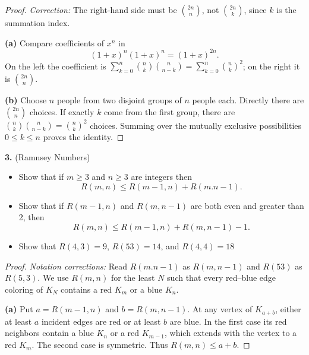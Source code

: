\documentclass[12pt]{amsart}
\begin{document}
\begin{onehalfspace}
        \begin{proof}
            \emph{Correction:} The right-hand side must be $\binom{2n}{n}$,
            not $\binom{2n}{k}$, since $k$ is the summation index.

            \textbf{(a)} Compare coefficients of $x^n$ in
            \[
                (1+x)^n(1+x)^n=(1+x)^{2n}.
            \]
            On the left the coefficient is
            $\sum_{k=0}^n\binom{n}{k}\binom{n}{n-k}
            =\sum_{k=0}^n\binom{n}{k}^2$; on the right it is
            $\binom{2n}{n}$.

            \textbf{(b)} Choose $n$ people from two disjoint groups of $n$
            people each. Directly there are $\binom{2n}{n}$ choices.
            If exactly $k$ come from the first group, there are
            $\binom{n}{k}\binom{n}{n-k}=\binom{n}{k}^2$ choices.
            Summing over the mutually exclusive possibilities $0\le k\le n$
            proves the identity.
        \end{proof}

        \noindent\textbf{3.} (Ramnsey Numbers)
        \begin{itemize}
            \item[(a)] Show that if $m\ge 3$ and $n\ge 3$ are integers then
            \[
                R(m,n) \le R(m-1,n) + R(m.n-1).
            \]
            \item[(b)] Show that if $R(m-1,n)$ and $R(m,n-1)$ are both even and greater than 2,
            then
            \[
                R(m,n) \le R(m-1,n) + R(m,n-1) - 1.
            \]
            \item[(c)] Show that $R(4,3) = 9$, $R(53) = 14$, and $R(4,4)=18$
        \end{itemize}

        \begin{proof}
            \emph{Notation corrections:} Read $R(m.n-1)$ as $R(m,n-1)$
            and $R(53)$ as $R(5,3)$. We use $R(m,n)$ for the least $N$
            such that every red--blue edge coloring of $K_N$ contains
            a red $K_m$ or a blue $K_n$.

            \textbf{(a)} Put $a=R(m-1,n)$ and $b=R(m,n-1)$.
            At any vertex of $K_{a+b}$, either at least $a$ incident edges
            are red or at least $b$ are blue. In the first case its red
            neighbors contain a blue $K_n$ or a red $K_{m-1}$, which extends
            with the vertex to a red $K_m$. The second case is symmetric.
            Thus $R(m,n)\le a+b$.


\end{proof}
\end{onehalfspace}
\end{document}

